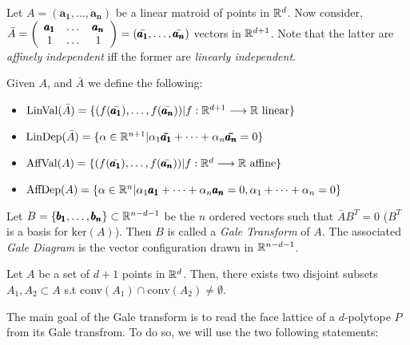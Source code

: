 Let $A = (\pmb{a_1}, \dots, \pmb{a_n})$ be a linear matroid of points in $\mathbb{R}^d$.
Now consider, $\bar{A} = \left( \begin{array}{c c c} \pmb{a_1} & \dots & \pmb{a_n} \\ 1 & \dots & 1 \end{array} \right) = (\bar{\pmb{a_1}}, \dots, \bar{\pmb{a_n}})$ vectors in $\mathbb{R}^{d+1}$.
Note that the latter are \textit{affinely independent} iff the former are \textit{linearly independent}.
\begin{definition}
    Given $A$, and $\bar{A}$ we define the following:
    \begin{itemize}
        \item $\text{LinVal}(\bar{A}) = \{(f(\bar{\pmb{a_1}}), \dots, f(\bar{\pmb{a_n}})) | f: \mathbb{R}^{d+1} \longrightarrow \mathbb{R} \text{ linear} \}$
        \item $\text{LinDep}(\bar{A}) = \{ \alpha \in \mathbb{R}^{n+1} | \alpha_1 \pmb{\bar{a_1}} + \dots + \alpha_n \pmb{\bar{a_n}} = 0 \}$
        \item $\text{AffVal}(A) = \{(f(\bar{\pmb{a_1}}), \dots, f(\bar{\pmb{a_n}})) | f: \mathbb{R}^{d} \longrightarrow \mathbb{R} \text{ affine} \}$
        \item $\text{AffDep}(A) = \{ \alpha \in \mathbb{R}^n | \alpha_1 \pmb{a_1} + \dots + \alpha_n \pmb{a_n} = 0, \alpha_1 + \dots + \alpha_n = 0 \}$
    \end{itemize}
\end{definition}

\begin{definition}
    Let $B = \{ \pmb{b_1}, \dots, \pmb{b_n} \} \subset \mathbb{R}^{n -d -1}$ be the $n$ ordered vectors such that $\bar{A} B^T = 0$ ($B^T$ is a basis for $\text{ker}(A)$).
    Then $B$ is called a \textit{Gale Transform} of $A$.
    The associated \textit{Gale Diagram} is the vector configuration drawn in $\mathbb{R}^{n -d -1}$.
\end{definition}

\begin{lemma}
    Let $A$ be a set of $d+1$ points in $\mathbb{R}^d$. Then, there exists two disjoint subsets $A_1, A_2 \subset A$ s.t conv$(A_1) \cap \text{conv}(A_2) \neq \emptyset$.
\end{lemma}

The main goal of the Gale transform is to read the face lattice of a $d$-polytope $P$ from its Gale transfrom.
To do so, we will use the two following statements:

